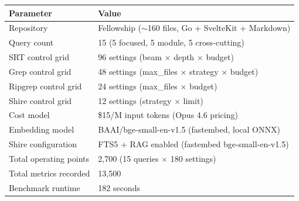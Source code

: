 \documentclass[11pt,a4paper]{article}
\begin{document}
\begin{tabular}{ll}
\toprule
\textbf{Parameter} & \textbf{Value} \\
\midrule
Repository & Fellowship ($\sim$160 files, Go + SvelteKit + Markdown) \\
Query count & 15 (5 focused, 5 module, 5 cross-cutting) \\
SRT control grid & 96 settings (beam $\times$ depth $\times$ budget) \\
Grep control grid & 48 settings (max\_files $\times$ strategy $\times$ budget) \\
Ripgrep control grid & 24 settings (max\_files $\times$ budget) \\
Shire control grid & 12 settings (strategy $\times$ limit) \\
Cost model & \$15/M input tokens (Opus 4.6 pricing) \\
Embedding model & BAAI/bge-small-en-v1.5 (fastembed, local ONNX) \\
Shire configuration & FTS5 + RAG enabled (fastembed bge-small-en-v1.5) \\
Total operating points & 2,700 (15 queries $\times$ 180 settings) \\
Total metrics recorded & 13,500 \\
Benchmark runtime & 182 seconds \\
\bottomrule
\end{tabular}
\end{document}
